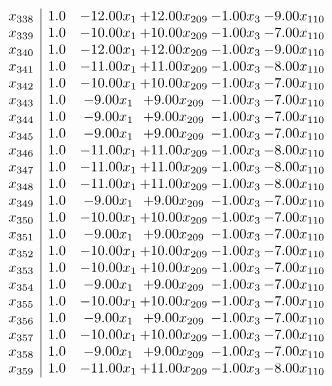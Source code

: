 \documentclass[8pt]{article}
\begin{document}
\[\begin{array}{c| c c@{\hskip 2pt} c@{\hskip 2pt} c@{\hskip 2pt} c@{\hskip 2pt} }
 x_{338}   &  1.0 & -12.00 x_{1} & + 12.00 x_{209} & -1.00 x_{3} & -9.00 x_{110}\\
 x_{339}   &  1.0 & -10.00 x_{1} & + 10.00 x_{209} & -1.00 x_{3} & -7.00 x_{110}\\
 x_{340}   &  1.0 & -12.00 x_{1} & + 12.00 x_{209} & -1.00 x_{3} & -9.00 x_{110}\\
 x_{341}   &  1.0 & -11.00 x_{1} & + 11.00 x_{209} & -1.00 x_{3} & -8.00 x_{110}\\
 x_{342}   &  1.0 & -10.00 x_{1} & + 10.00 x_{209} & -1.00 x_{3} & -7.00 x_{110}\\
 x_{343}   &  1.0 & -9.00 x_{1} & +  9.00 x_{209} & -1.00 x_{3} & -7.00 x_{110}\\
 x_{344}   &  1.0 & -9.00 x_{1} & +  9.00 x_{209} & -1.00 x_{3} & -7.00 x_{110}\\
 x_{345}   &  1.0 & -9.00 x_{1} & +  9.00 x_{209} & -1.00 x_{3} & -7.00 x_{110}\\
 x_{346}   &  1.0 & -11.00 x_{1} & + 11.00 x_{209} & -1.00 x_{3} & -8.00 x_{110}\\
 x_{347}   &  1.0 & -11.00 x_{1} & + 11.00 x_{209} & -1.00 x_{3} & -8.00 x_{110}\\
 x_{348}   &  1.0 & -11.00 x_{1} & + 11.00 x_{209} & -1.00 x_{3} & -8.00 x_{110}\\
 x_{349}   &  1.0 & -9.00 x_{1} & +  9.00 x_{209} & -1.00 x_{3} & -7.00 x_{110}\\
 x_{350}   &  1.0 & -10.00 x_{1} & + 10.00 x_{209} & -1.00 x_{3} & -7.00 x_{110}\\
 x_{351}   &  1.0 & -9.00 x_{1} & +  9.00 x_{209} & -1.00 x_{3} & -7.00 x_{110}\\
 x_{352}   &  1.0 & -10.00 x_{1} & + 10.00 x_{209} & -1.00 x_{3} & -7.00 x_{110}\\
 x_{353}   &  1.0 & -10.00 x_{1} & + 10.00 x_{209} & -1.00 x_{3} & -7.00 x_{110}\\
 x_{354}   &  1.0 & -9.00 x_{1} & +  9.00 x_{209} & -1.00 x_{3} & -7.00 x_{110}\\
 x_{355}   &  1.0 & -10.00 x_{1} & + 10.00 x_{209} & -1.00 x_{3} & -7.00 x_{110}\\
 x_{356}   &  1.0 & -9.00 x_{1} & +  9.00 x_{209} & -1.00 x_{3} & -7.00 x_{110}\\
 x_{357}   &  1.0 & -10.00 x_{1} & + 10.00 x_{209} & -1.00 x_{3} & -7.00 x_{110}\\
 x_{358}   &  1.0 & -9.00 x_{1} & +  9.00 x_{209} & -1.00 x_{3} & -7.00 x_{110}\\
 x_{359}   &  1.0 & -11.00 x_{1} & + 11.00 x_{209} & -1.00 x_{3} & -8.00 x_{110}\\

\end{array}\]
\end{document}
